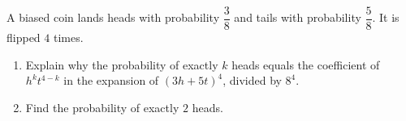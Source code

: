 A biased coin lands heads with probability $\dfrac38$ and tails with probability $\dfrac58$. It is flipped $4$ times.
\begin{enumerate}
\item[(a)] Explain why the probability of exactly $k$ heads equals the coefficient of $h^kt^{4-k}$ in the expansion of $(3h+5t)^4$, divided by $8^4$.
\item[(b)] Find the probability of exactly $2$ heads.
\end{enumerate}
